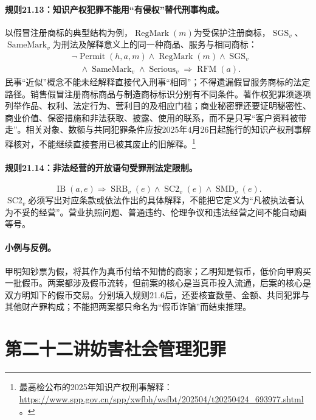 \paragraph{规则21.13：知识产权犯罪不能用“有侵权”替代刑事构成。}
以假冒注册商标的典型结构为例，$\operatorname{RegMark}(m)$为受保护注册商标，$\operatorname{SGS}_v$、$\operatorname{SameMark}_v$为刑法及解释意义上的同一种商品、服务与相同商标：
\[
\begin{aligned}
&\neg\operatorname{Permit}(h,a,m)\land\operatorname{RegMark}(m)
\land\operatorname{SGS}_v\\
&\quad\land\operatorname{SameMark}_v\land\operatorname{Serious}_v
\Rightarrow\operatorname{RFM}(a).
\end{aligned}
\]
民事“近似”概念不能未经解释直接代入刑事“相同”；不得遗漏假冒服务商标的法定路径。销售假冒注册商标商品与制造商标标识分别有不同条件。著作权犯罪须逐项列举作品、权利、法定行为、营利目的及相应门槛；商业秘密罪还要证明秘密性、商业价值、保密措施和非法获取、披露、使用的联系，而不是只写“客户资料被带走”。相关对象、数额与共同犯罪条件应按2025年4月26日起施行的知识产权刑事解释核对，不能继续直接套用已被其废止的旧解释。\footnote{最高检公布的2025年知识产权刑事解释：\url{https://www.spp.gov.cn/spp/xwfbh/wsfbt/202504/t20250424_693977.shtml}。}

\paragraph{规则21.14：非法经营的开放语句受罪刑法定限制。}
\[
\operatorname{IB}(a,e)
\Rightarrow\operatorname{SRB}_v(e)
\land\operatorname{SC2}_v(e)
\land\operatorname{SMD}_v(e).
\]
$\operatorname{SC2}_v$必须写出对应条款或依法作出的具体解释，不能把它定义为“凡被执法者认为不妥的经营”。营业执照问题、普通违约、伦理争议和违法经营之间不能自动画等号。

\paragraph{小例与反例。}
甲明知钞票为假，将其作为真币付给不知情的商家；乙明知是假币，低价向甲购买一批假币。两案都涉及假币流转，但前案的核心是当真币投入流通，后案的核心是双方明知下的假币交易。分别填入规则21.6后，还要核查数量、金额、共同犯罪与其他财产罪构成；不能把两案都只命名为“假币诈骗”而结束推理。

\section{第二十二讲\quad 妨害社会管理犯罪}


